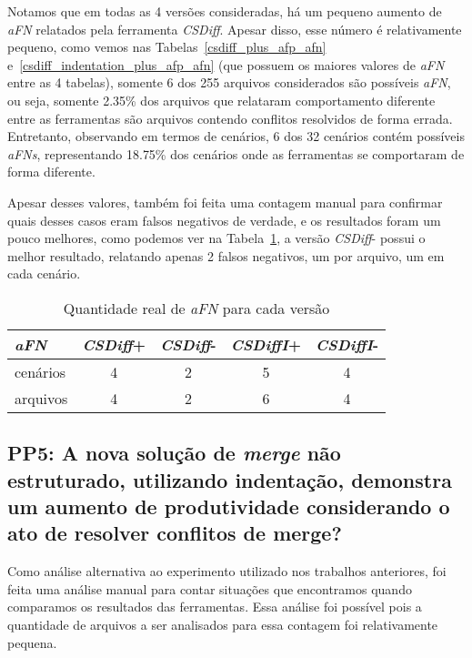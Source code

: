 Notamos que em todas as 4 versões consideradas, há um pequeno aumento de \emph{aFN} relatados pela ferramenta \emph{CSDiff}. Apesar disso, esse
número é relativamente pequeno, como vemos nas Tabelas~\ref{csdiff_plus_afp_afn} e~\ref{csdiff_indentation_plus_afp_afn} (que
possuem os maiores valores de \emph{aFN} entre as 4 tabelas), somente 6 dos 255 arquivos considerados são possíveis \emph{aFN}, ou seja, somente
2.35\% dos arquivos que relataram comportamento diferente entre as ferramentas são arquivos contendo
conflitos resolvidos de forma errada. Entretanto, observando em termos de cenários, 6 dos 32 cenários contém possíveis \emph{aFNs},
representando 18.75\% dos cenários onde as ferramentas se comportaram de forma diferente.

Apesar desses valores, também foi feita uma contagem manual para confirmar quais desses casos eram falsos negativos de verdade,
e os resultados foram um pouco melhores, como podemos ver na Tabela~\ref{tabela_afn_final}, a versão \emph{CSDiff}- possui o melhor
resultado, relatando apenas 2 falsos negativos, um por arquivo, um em cada cenário.
\begin{table}[ht]
	\begin{center}
		\begin{tabular}{|l|c|c|c|c|}
			\hline
			\textbf{\emph{aFN}} & \textbf{\emph{CSDiff}+} & \textbf{\emph{CSDiff}-} & \textbf{\emph{CSDiffI}+} & \textbf{\emph{CSDiffI}-} \\
			\hline
			cenários     & 4                & 2                & 5                 & 4                 \\
			arquivos     & 4                & 2                & 6                 & 4                 \\
			\hline
		\end{tabular}
	\end{center}
	\caption{Quantidade real de \emph{aFN} para cada versão}\label{tabela_afn_final}
\end{table}

\subsection{PP5: A nova solução de \emph{merge} não estruturado, utilizando indentação,
	demonstra um aumento de produtividade considerando o ato de resolver conflitos de merge?}
Como análise alternativa ao experimento utilizado nos trabalhos anteriores, foi feita uma análise manual para contar
situações que encontramos quando comparamos os resultados das ferramentas. Essa análise foi possível pois a quantidade de
arquivos a ser analisados para essa contagem foi relativamente pequena.

